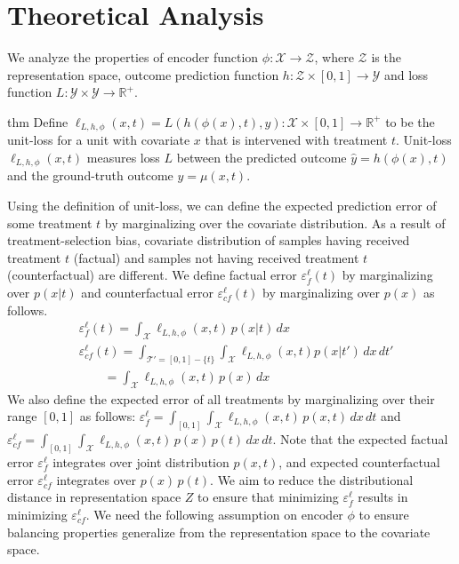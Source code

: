 \documentclass[letterpaper]{article} %
\begin{document}
\section{Theoretical Analysis}
We analyze the properties of encoder function $\phi: \mathcal{X} \rightarrow \mathcal{Z}$, where $\mathcal{Z}$ is the representation space, outcome prediction function $h: \mathcal{Z} \times  [0, 1] \rightarrow \mathcal{Y}$ and loss function $L: \mathcal{Y} \times \mathcal{Y} \rightarrow \mathbb{R}^+$. 
\newline
\newline
\begin{restatable*}{thm}{} 
\label{def1}
Define $\ell_{L, h, \phi}(x, t) = L(h(\phi(x), t), y): \mathcal{X} \times [0, 1] \rightarrow \mathbb{R}^+$ to be the unit-loss for a unit with covariate $x$ that is intervened with treatment $t$. Unit-loss $\ell_{L, h, \phi}(x, t)$ measures loss $L$ between the predicted outcome $\hat{y} = h(\phi(x), t)$ and the ground-truth outcome $y = \mu(x, t)$.
\end{restatable*}
\newline
\newline
Using the definition of unit-loss, we can define the expected prediction error of some treatment $t$ by marginalizing over the covariate distribution. As a result of treatment-selection bias, covariate distribution of samples having received treatment $t$ (factual) and samples not having received treatment $t$ (counterfactual) are different. We define factual error $\varepsilon_f^{\ell}(t)$ by marginalizing over $p(x|t)$ and counterfactual error $\varepsilon_{cf}^{\ell}(t)$ by marginalizing over $p(x)$ as follows.  
\begin{align*}
    &\varepsilon_f^{\ell}(t) = \int_{\mathcal{X}} \ell_{L, h, \phi}(x, t)\, p(x|t)\, dx \\
    &\varepsilon_{cf}^{\ell}(t) = \int_{\mathcal{T}' = [0, 1] - \{t\}}\int_{\mathcal{X}} \ell_{L, h, \phi}(x, t) p(x|t')\, dx \, dt' \\ &\qquad = \int_{\mathcal{X}} \ell_{L, h, \phi}(x, t)\, p(x)\, dx 
\end{align*}
We also define the expected error of all treatments by marginalizing over their range $[0, 1]$ as follows:
$\varepsilon_f^{\ell} = \int_{[0, 1]} \int_{\mathcal{X}} \ell_{L, h, \phi}(x, t)\, p(x, t) \, dx \, dt$ and $\varepsilon_{cf}^{\ell} = \int_{[0, 1]} \int_{\mathcal{X}} \ell_{L, h, \phi}(x, t)\, p(x)\,p(t)\,dx\, dt$.
Note that the expected factual error $\varepsilon_f^{\ell}$ integrates over joint distribution $p(x, t)$, and expected counterfactual error $\varepsilon_{cf}^{\ell}$ integrates over $p(x)\,p(t)$. We aim to reduce the distributional distance in representation space $Z$ to ensure that minimizing $\varepsilon_f^{\ell}$ results in minimizing $\varepsilon_{cf}^{\ell}$. We need the following assumption on encoder $\phi$ to ensure balancing properties generalize from the representation space to the covariate space.
\end{document}
